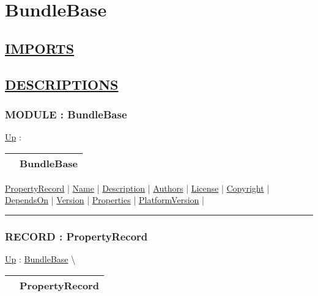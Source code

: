 \chapter*{BundleBase}
\hypertarget{ecldoc:toc:BundleBase}{}

\section*{\underline{IMPORTS}}

\section*{\underline{DESCRIPTIONS}}
\subsection*{MODULE : BundleBase}
\hypertarget{ecldoc:BundleBase}{}
\hyperlink{ecldoc:toc:root}{Up} :

{\renewcommand{\arraystretch}{1.5}
\begin{tabularx}{\textwidth}{|>{\raggedright\arraybackslash}l|X|}
\hline
\hspace{0pt} & BundleBase \\
\hline
\end{tabularx}
}

\par


\hyperlink{ecldoc:bundlebase.propertyrecord}{PropertyRecord}  |
\hyperlink{ecldoc:bundlebase.name}{Name}  |
\hyperlink{ecldoc:bundlebase.description}{Description}  |
\hyperlink{ecldoc:bundlebase.authors}{Authors}  |
\hyperlink{ecldoc:bundlebase.license}{License}  |
\hyperlink{ecldoc:bundlebase.copyright}{Copyright}  |
\hyperlink{ecldoc:bundlebase.dependson}{DependsOn}  |
\hyperlink{ecldoc:bundlebase.version}{Version}  |
\hyperlink{ecldoc:bundlebase.properties}{Properties}  |
\hyperlink{ecldoc:bundlebase.platformversion}{PlatformVersion}  |

\rule{\linewidth}{0.5pt}

\subsection*{RECORD : PropertyRecord}
\hypertarget{ecldoc:bundlebase.propertyrecord}{}
\hyperlink{ecldoc:BundleBase}{Up} :
\hspace{0pt} \hyperlink{ecldoc:BundleBase}{BundleBase} \textbackslash 

{\renewcommand{\arraystretch}{1.5}
\begin{tabularx}{\textwidth}{|>{\raggedright\arraybackslash}l|X|}
\hline
\hspace{0pt} & PropertyRecord \\
\hline
\end{tabularx}
}

